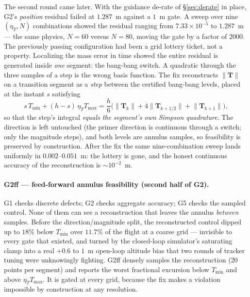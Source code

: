 \documentclass[11pt]{article}
\newcommand{\Tvec}{\mathbf{T}}
\newcommand{\Tmin}{T_{\min}}
\newcommand{\Tmax}{T_{\max}}
\newcommand{\etaT}{\eta_T}
\begin{document}
The second round came later. With the guidance de-rate of
\S\ref{sec:derate} in place, G2's \emph{position} residual failed at
$1.287$~m against a $1$~m gate. A sweep over nine $(\etaT, N)$ combinations
showed the residual ranging from $7.33\times10^{-5}$ to $1.287$~m --- the
same physics, $N=60$ versus $N=80$, moving the gate by a factor of $2000$.
The previously passing configuration had been a grid lottery ticket, not a
property. Localizing the mass error in time showed the entire residual is
generated inside \emph{one} segment: the bang-bang switch. A quadratic
through the three samples of a step is the wrong basis function. The fix
reconstructs $\lVert\Tvec\rVert$ on a transition segment as a \emph{step}
between the certified bang-bang levels, placed at the instant $s$ satisfying
%
\begin{equation}
s\,\Tmin + (h - s)\,\etaT\Tmax
= \frac{h}{6}\Big( \lVert\Tvec_k\rVert + 4\lVert\Tvec_{k+1/2}\rVert
+ \lVert\Tvec_{k+1}\rVert \Big),
\label{eq:switchstep}
\end{equation}
%
so that the step's integral \emph{equals the segment's own Simpson
quadrature}. The direction is left untouched (the primer direction is
continuous through a switch; only the magnitude steps), and both levels are
annulus samples, so feasibility is preserved by construction. After the fix
the same nine-combination sweep lands uniformly in $0.002$--$0.051$~m: the
lottery is gone, and the honest continuous accuracy of the reconstruction is
$\sim 10^{-2}$~m.

\paragraph{G2ff --- feed-forward annulus feasibility (second half of G2).}
G1 checks discrete defects; G2 checks aggregate accuracy; G5 checks the
sampled control. None of them can see a reconstruction that leaves the
annulus \emph{between} samples. Before the direction/magnitude split, the
reconstructed control dipped up to $18\%$ below $\Tmin$ over $11.7\%$ of the
flight at a coarse grid --- invisible to every gate that existed, and turned
by the closed-loop simulator's saturating clamp into a real
$+0.6$ to $1$~m open-loop altitude bias that two rounds of tracker tuning
were unknowingly fighting. G2ff densely samples the reconstruction (20
points per segment) and reports the worst fractional excursion below $\Tmin$
and above $\etaT\Tmax$. It is gated at every grid, because the fix makes a
violation impossible by construction at any resolution.
\end{document}
